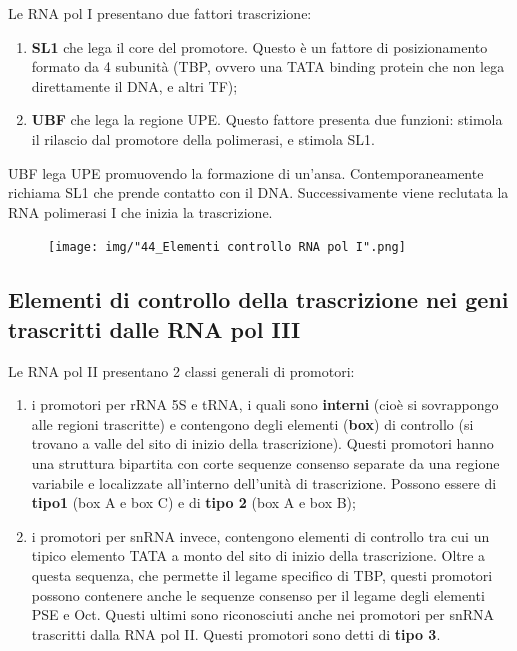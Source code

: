 \documentclass[11pt]{book}
\begin{document}
Le RNA pol I presentano due fattori trascrizione:

\begin{enumerate}
\def\labelenumi{\arabic{enumi}.}
\itemsep1pt\parskip0pt
\item
  \textbf{SL1} che lega il core del promotore. Questo è un fattore di
  posizionamento formato da 4 subunità (TBP, ovvero una TATA binding
  protein che non lega direttamente il DNA, e altri TF);
\item
  \textbf{UBF} che lega la regione UPE. Questo fattore presenta due
  funzioni: stimola il rilascio dal promotore della polimerasi, e
  stimola SL1.
\end{enumerate}

UBF lega UPE promuovendo la formazione di un'ansa. Contemporaneamente
richiama SL1 che prende contatto con il DNA. Successivamente viene
reclutata la RNA polimerasi I che inizia la trascrizione.

\begin{figure}[htp]
\centering
\texttt{[image: img/"44\_Elementi controllo RNA pol I".png]}
\caption{}
\label{elementi-controllo-rna-pol-i}
\end{figure}

\subsection{Elementi di controllo della trascrizione nei geni
trascritti dalle RNA pol
III}\label{elementi-di-controllo-della-trascrizione-nei-geni-trascritti-dalle-rna-pol-iii}

Le RNA pol II presentano 2 classi generali di promotori:

\begin{enumerate}
\def\labelenumi{\arabic{enumi}.}
\itemsep1pt\parskip0pt
\item
  i promotori per rRNA 5S e tRNA, i quali sono \textbf{interni} (cioè si
  sovrappongo alle regioni trascritte) e contengono degli elementi
  (\textbf{box}) di controllo (si trovano a valle del sito di inizio
  della trascrizione). Questi promotori hanno una struttura bipartita
  con corte sequenze consenso separate da una regione variabile e
  localizzate all'interno dell'unità di trascrizione. Possono essere di
  \textbf{tipo1} (box A e box C) e di \textbf{tipo 2} (box A e box B);
\item
  i promotori per snRNA invece, contengono elementi di controllo tra cui
  un tipico elemento TATA a monto del sito di inizio della trascrizione.
  Oltre a questa sequenza, che permette il legame specifico di TBP,
  questi promotori possono contenere anche le sequenze consenso per il
  legame degli elementi PSE e Oct. Questi ultimi sono riconosciuti anche
  nei promotori per snRNA trascritti dalla RNA pol II. Questi promotori
  sono detti di \textbf{tipo 3}.
\end{enumerate}
\end{document}
